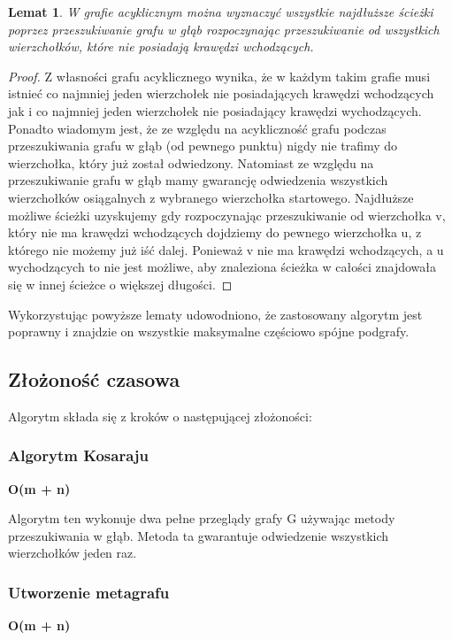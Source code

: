 \documentclass[a4paper,10pt]{article}
\newtheorem{lem}[twr]{Lemat}
\begin{document}
\begin{lem}
\label{sciezki_acykl}
W grafie acyklicznym można wyznaczyć wszystkie najdłuższe ścieżki
poprzez przeszukiwanie grafu w głąb rozpoczynając przeszukiwanie od
wszystkich wierzchołków, które nie posiadają krawędzi wchodzących.
\end{lem}

\begin{proof}
  Z własności grafu acyklicznego wynika, że w każdym takim grafie musi
  istnieć co najmniej jeden wierzchołek nie posiadających krawędzi
  wchodzących jak i co najmniej jeden wierzchołek nie posiadający
  krawędzi wychodzących. Ponadto wiadomym jest, że ze względu na
  acykliczność grafu podczas przeszukiwania grafu w głąb (od pewnego
  punktu) nigdy nie trafimy do wierzchołka, który już został
  odwiedzony. Natomiast ze względu na przeszukiwanie grafu w głąb mamy
  gwarancję odwiedzenia wszystkich wierzchołków osiągalnych z
  wybranego wierzchołka startowego. Najdłuższe możliwe ścieżki
  uzyskujemy gdy rozpoczynając przeszukiwanie od wierzchołka v, który
  nie ma krawędzi wchodzących dojdziemy do pewnego wierzchołka u, z
  którego nie możemy już iść dalej. Ponieważ v nie ma krawędzi
  wchodzących, a u wychodzących to nie jest możliwe, aby znaleziona
  ścieżka w całości znajdowała się w innej ścieżce o większej
  długości.
\end{proof}

Wykorzystując powyższe lematy udowodniono, że zastosowany algorytm
jest poprawny i znajdzie on wszystkie maksymalne częściowo spójne
podgrafy.

\subsection{Złożoność czasowa}
Algorytm składa się z kroków o następującej złożoności:


\subsubsection{Algorytm Kosaraju}
\begin{center}
{\large\bf O(m + n)}
\end{center}

Algorytm ten wykonuje dwa pełne przeglądy grafy G używając metody
przeszukiwania w głąb. Metoda ta gwarantuje odwiedzenie wszystkich
wierzchołków jeden raz.

\subsubsection{Utworzenie metagrafu}
\begin{center}
{\large\bf O(m + n)}
\end{center}
\end{document}
